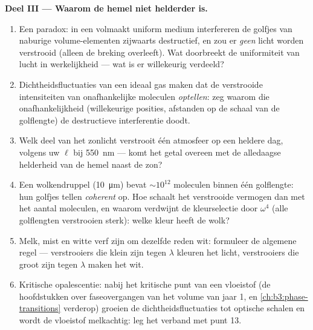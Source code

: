 \begin{problem}
\medskip\noindent\textbf{Deel III --- Waarom de hemel niet helderder
is.}
\begin{enumerate}[resume]
  \item Een paradox: in een volmaakt uniform medium interfereren de
        golfjes van naburige volume-elementen zijwaarts destructief, en
        zou er \emph{geen} licht worden verstrooid (alleen de breking
        overleeft). Wat doorbreekt de uniformiteit van lucht in
        werkelijkheid --- wat is er willekeurig verdeeld?
  \item Dichtheidsfluctuaties van een ideaal gas maken dat de
        verstrooide intensiteiten van onafhankelijke moleculen
        \emph{optellen}: zeg waarom die onafhankelijkheid (willekeurige
        posities, afstanden op de schaal van de golflengte) de
        destructieve interferentie doodt.
  \item Welk deel van het zonlicht verstrooit één atmosfeer op een
        heldere dag, volgens uw $\ell$ bij \qty{550}{nm} --- komt het
        getal overeen met de alledaagse helderheid van de hemel naast de
        zon?
  \item Een wolkendruppel (\qty{10}{\micro m}) bevat $\sim10^{12}$
        moleculen binnen één golflengte: hun golfjes tellen
        \emph{coherent} op. Hoe schaalt het verstrooide vermogen dan met
        het aantal moleculen, en waarom verdwijnt de kleurselectie door
        $\omega^4$ (alle golflengten verstrooien sterk): welke kleur
        heeft de wolk?
  \item Melk, mist en witte verf zijn om dezelfde reden wit: formuleer
        de algemene regel --- verstrooiers die klein zijn tegen $\lambda$
        kleuren het licht, verstrooiers die groot zijn tegen $\lambda$
        maken het wit.
  \item Kritische opalescentie: nabij het kritische punt van een
        vloeistof (de hoofdstukken over faseovergangen van het volume van
        jaar 1, en \cref{ch:b3:phase-transitions} verderop) groeien de dichtheidsfluctuaties tot optische
        schalen en wordt de vloeistof melkachtig: leg het verband met punt
        13.
\end{enumerate}


\end{problem}
